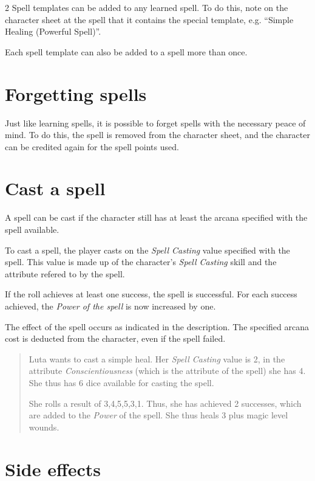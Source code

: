 \begin{multicols}{2}
Spell templates can be added to any learned spell. To do this, note on the character sheet at the spell that it contains the special template, e.g. ``Simple Healing (Powerful Spell)''.

Each spell template can also be added to a spell more than once.

\section{Forgetting spells}

Just like learning spells, it is possible to forget spells with the necessary peace of mind. To do this, the spell is removed from the character sheet, and the character can be credited again for the spell points used.

\section{Cast a spell}

A spell can be cast if the character still has at least the arcana specified with the spell available.

To cast a spell, the player casts on the \textit{Spell Casting} value specified with the spell. This value is made up of the character's \textit{Spell Casting} skill and the attribute refered to by the spell.

If the roll achieves at least one success, the spell is successful. For each success achieved, the \textit{Power of the spell} is now increased by one.

The effect of the spell occurs as indicated in the description. The specified arcana cost is deducted from the character, even if the spell failed.

\begin{quote}
Luta wants to cast a simple heal. Her \textit{Spell Casting} value is 2, in the attribute \textit{Conscientiousness} (which is the attribute of the spell) she has 4. She thus has 6 dice available for casting the spell.

She rolls a result of 3,4,5,5,3,1. Thus, she has achieved 2 successes, which are added to the \textit{Power} of the spell. She thus heals 3 plus magic level wounds.
\end{quote}

\section{Side effects}


\end{multicols}

